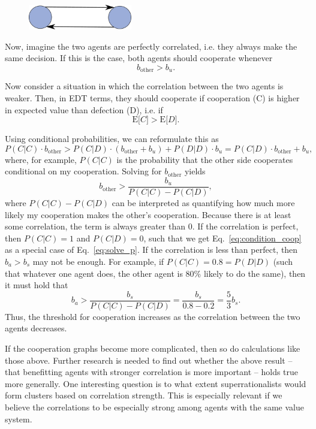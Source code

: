 \begin{figure}[h!]
    \centering
    \includegraphics[width=1.78in]{figs/mutual-cooperation-graph}
\end{figure}

Now, imagine the two agents are perfectly correlated, i.e. they always
make the same decision. If this is the case, both agents should
cooperate whenever
\begin{equation}
    b_{\text{other}} > b_{u}.
    \label{eq:condition_coop}
\end{equation}

Now consider a situation in which the correlation between the two agents
is weaker. Then, in EDT terms, they should cooperate if cooperation (C)
is higher in expected value than defection (D), i.e. if
$$
\mathrm{E}\lbrack C\rbrack > \mathrm{E}\lbrack D\rbrack.
$$

Using conditional probabilities, we can reformulate this as
$$
P(C|C) \cdot b_{\text{other}} > P(C|D) \cdot (b_{\text{other}} + b_{u}) + P(D|D) \cdot b_{u} =
P(C|D) \cdot b_{\text{other}} + b_{u},
$$
where, for example, \(P(C|C)\) is the probability that the other side
cooperates conditional on my cooperation. Solving for \(b_{\text{other}}\) yields
\begin{equation}
    b_{\text{other}} > \frac{b_{u}}{P(C|C) - P(C|D)},
    \label{eq:solve_p}
\end{equation}
where \(P(C|C) - P(C|D)\) can be interpreted as quantifying how much
more likely my cooperation makes the other's cooperation. Because there
is at least some correlation, the term is always greater than 0. If the
correlation is perfect, then \(P(C|C) = 1\) and \(P(C|D) = 0\), such
that we get Eq.~\eqref{eq:condition_coop} as a special case of Eq.~\eqref{eq:solve_p}. If the correlation is less
than perfect, then \(b_{a} > b_{s}\) may not be enough. For example, if
\(P(C|C) = 0.8 = P(D|D)\) (such that whatever one agent does, the other
agent is 80\% likely to do the same), then it must hold that
$$
b_{a} > \frac{b_{s}}{P(C|C) - P(C|D)} = \frac{b_{s}}{0.8 - 0.2} = \frac{5}{3}b_{s}.
$$
Thus, the threshold for cooperation increases as the correlation between
the two agents decreases.

If the cooperation graphs become more complicated, then so do
calculations like those above. Further research is needed to find out
whether the above result -- that benefitting agents with stronger
correlation is more important -- holds true more generally. One
interesting question is to what extent superrationalists would form
clusters based on correlation strength. This is especially relevant if
we believe the correlations to be especially strong among agents with
the same value system.

